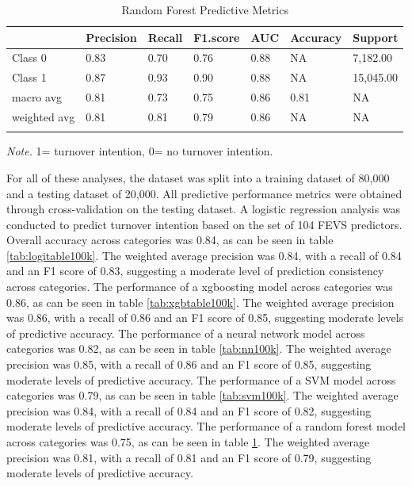 \documentclass[
  man]{apa7}
\begin{document}
\begin{table}[tbp]

\begin{center}
\begin{threeparttable}

\caption{\label{tab:rf100k}Random Forest Predictive Metrics}

\begin{tabular}{lllllll}
\toprule
 & \multicolumn{1}{c}{Precision} & \multicolumn{1}{c}{Recall} & \multicolumn{1}{c}{F1.score} & \multicolumn{1}{c}{AUC} & \multicolumn{1}{c}{Accuracy} & \multicolumn{1}{c}{Support}\\
\midrule
Class 0 & 0.83 & 0.70 & 0.76 & 0.88 & NA & 7,182.00\\
Class 1 & 0.87 & 0.93 & 0.90 & 0.88 & NA & 15,045.00\\
macro avg & 0.81 & 0.73 & 0.75 & 0.86 & 0.81 & NA\\
weighted avg & 0.81 & 0.81 & 0.79 & 0.86 & NA & NA\\
\bottomrule
\addlinespace
\end{tabular}

\begin{tablenotes}[para]
\normalsize{\textit{Note.} 1= turnover intention, 0= no turnover intention.}
\end{tablenotes}

\end{threeparttable}
\end{center}

\end{table}

For all of these analyses, the dataset was split into a training dataset of 80,000 and a testing dataset of 20,000. All predictive performance metrics were obtained through cross-validation on the testing dataset. A logistic regression analysis was conducted to predict turnover intention based on the set of 104 FEVS predictors. Overall accuracy across categories was 0.84, as can be seen in table \ref{tab:logitable100k}. The weighted average precision was 0.84, with a recall of 0.84 and an F1 score of 0.83, suggesting a moderate level of prediction consistency across categories.
The performance of a xgboosting model across categories was 0.86, as can be seen in table \ref{tab:xgbtable100k}. The weighted average precision was 0.86, with a recall of 0.86 and an F1 score of 0.85, suggesting moderate levels of predictive accuracy.
The performance of a neural network model across categories was 0.82, as can be seen in table \ref{tab:nn100k}. The weighted average precision was 0.85, with a recall of 0.86 and an F1 score of 0.85, suggesting moderate levels of predictive accuracy.
The performance of a SVM model across categories was 0.79, as can be seen in table \ref{tab:svm100k}. The weighted average precision was 0.84, with a recall of 0.84 and an F1 score of 0.82, suggesting moderate levels of predictive accuracy.
The performance of a random forest model across categories was 0.75, as can be seen in table \ref{tab:rf100k}. The weighted average precision was 0.81, with a recall of 0.81 and an F1 score of 0.79, suggesting moderate levels of predictive accuracy.
\end{document}
